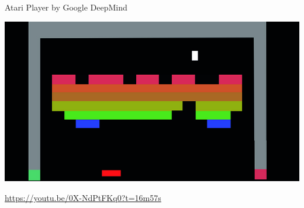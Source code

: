 \documentclass{beamer}
\begin{document}
  {
    \begin{frame}{Atari Player by Google DeepMind}
      \begin{center}
        \includegraphics[width=\textwidth, height=\textheight, keepaspectratio]{../img/atari_breakout.jpg}

        \url{https://youtu.be/0X-NdPtFKq0?t=16m57s}
      \end{center}
    \end{frame}
  }
\end{document}
